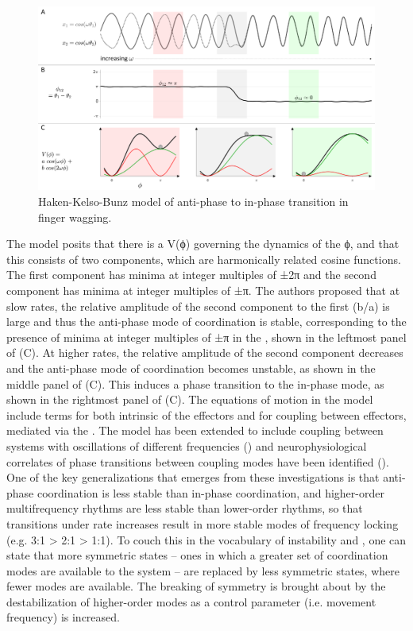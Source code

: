   
\begin{figure}
\includegraphics[width=\textwidth]{figures/Tilsen-img167.png}
\caption{Haken-Kelso-Bunz model of anti-phase to in-phase transition in finger wagging.}
\label{fig:8:1}
\end{figure}
 

  The \citet{HakenEtAl1985} model posits that there is a  V(ϕ) governing the dynamics of the  ϕ, and that this  consists of two components, which are harmonically related cosine functions. The first component has minima at integer multiples of ±2π and the second component has minima at integer multiples of ±π. The authors proposed that at slow rates, the relative amplitude of the second component to the first (b/a) is large and thus the anti-phase mode of coordination is stable, corresponding to the presence of minima at integer multiples of ±π in the , shown in the leftmost panel of {}(C). At higher rates, the relative amplitude of the second component decreases and the anti-phase mode of coordination becomes unstable, as shown in the middle panel of (C). This induces a phase transition to the in-phase mode, as shown in the rightmost panel of (C). The equations of motion in the model include terms for both intrinsic  of the effectors and for coupling between effectors, mediated via the . The model has been extended to include coupling between systems with oscillations of different frequencies (\citealt{Haken1996,Kelso1991,PeperEtAl1995,SternadEtAl1999}) and neurophysiological correlates of phase transitions between coupling modes have been identified  (\citealt{JantzenKelso2007,JantzenEtAl2008}). One of the key generalizations that emerges from these investigations is that anti-phase coordination is less stable than in-phase coordination, and higher-order multifrequency rhythms are less stable than lower-order rhythms, so that transitions under rate increases result in more stable modes of frequency locking (e.g. 3:1 > 2:1 > 1:1). To couch this in the vocabulary of instability and , one can state that more symmetric states -- ones in which a greater set of coordination modes are available to the system -- are replaced by less symmetric states, where fewer modes are available. The breaking of symmetry is brought about by the destabilization of higher-order modes as a control parameter (i.e. movement frequency) is increased.

